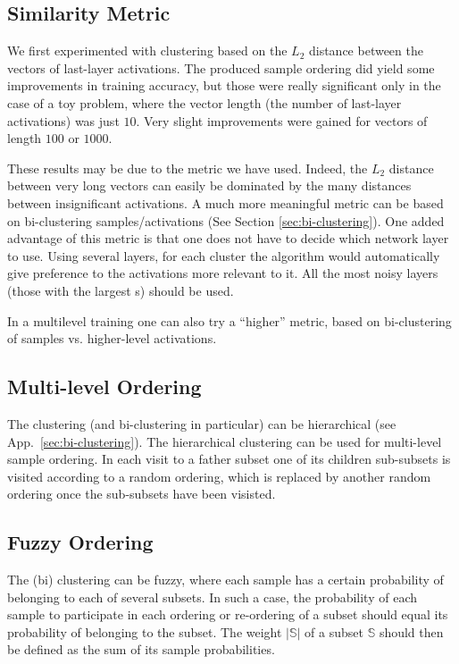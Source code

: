 \documentclass{article} %
\begin{document}
\subsection{Similarity Metric}
We first experimented with clustering based on the $L_2$ distance between the vectors of last-layer activations. The produced sample ordering did yield some improvements in training accuracy, but those were really significant only in the case of a toy problem, where the vector length (the number of last-layer activations) was just $10$. Very slight improvements were gained for vectors of length $100$ or $1000$. 

These results may be due to the metric we have used. Indeed, the $L_2$ distance between very long vectors can easily be dominated by the many distances between insignificant activations. A much more meaningful metric can be based on bi-clustering samples/activations (See Section \ref{sec:bi-clustering}). One added advantage of this metric is that one does not have to decide which network layer to use. Using several layers, for each cluster the algorithm would automatically give preference to the activations more relevant to it. All the most noisy layers (those with the largest {\NAL}s) should be used. 

In a multilevel training one can also try a ``higher'' metric, based on bi-clustering of samples vs. higher-level activations.

\subsection{Multi-level Ordering}
The clustering (and bi-clustering in particular) can be hierarchical (see App.~\ref{sec:bi-clustering}). The hierarchical clustering can be used for multi-level sample ordering. In each visit to a father subset one of its children sub-subsets is visited according to a random ordering, which is replaced by another random ordering once the sub-subsets have been visisted.

\subsection{Fuzzy Ordering}
The (bi) clustering can be fuzzy, where each sample has a certain probability of belonging to each of several subsets. In such a case, the probability of each sample to participate in each ordering or re-ordering of a subset should equal its probability of belonging to the subset. The weight $|\mathbb{S}|$ of a subset $\mathbb{S}$ should then be defined as the sum of its sample probabilities. 
\end{document}
